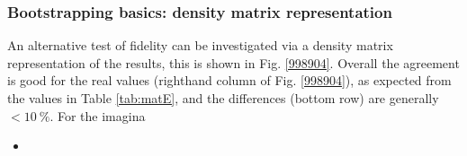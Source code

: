 \subsubsection{Bootstrapping basics: density matrix representation}

An alternative test of fidelity can be investigated via a density matrix representation of the results, this is shown in Fig. \ref{998904}. Overall the agreement is good for the real values (righthand column of Fig. \ref{998904}), as expected from the values in Table \ref{tab:matE}, and the differences (bottom row) are generally $<10~\%$. For the imagina

\begin{itemize}
\item 
\end{itemize}